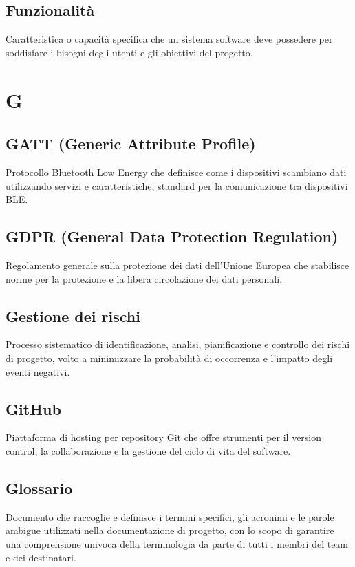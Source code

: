 \documentclass[a4paper,11pt]{article}
\begin{document}
\subsection{Funzionalità}
Caratteristica o capacità specifica che un sistema software deve possedere per soddisfare i bisogni degli utenti e gli obiettivi del progetto.

\newpage
\section{G}

\subsection{GATT (Generic Attribute Profile)}
Protocollo Bluetooth Low Energy che definisce come i dispositivi scambiano dati utilizzando servizi e caratteristiche, standard per la comunicazione tra dispositivi BLE.

\subsection{GDPR (General Data Protection Regulation)}
Regolamento generale sulla protezione dei dati dell'Unione Europea che stabilisce norme per la protezione e la libera circolazione dei dati personali.

\subsection{Gestione dei rischi}
Processo sistematico di identificazione, analisi, pianificazione e controllo dei rischi di progetto, volto a minimizzare la probabilità di occorrenza e l'impatto degli eventi negativi.

\subsection{GitHub}
Piattaforma di hosting per repository Git che offre strumenti per il version control, la collaborazione e la gestione del ciclo di vita del software.

\subsection{Glossario}
Documento che raccoglie e definisce i termini specifici, gli acronimi e le parole ambigue utilizzati nella documentazione di progetto, con lo scopo di garantire una comprensione univoca della terminologia da parte di tutti i membri del team e dei destinatari.
\end{document}
